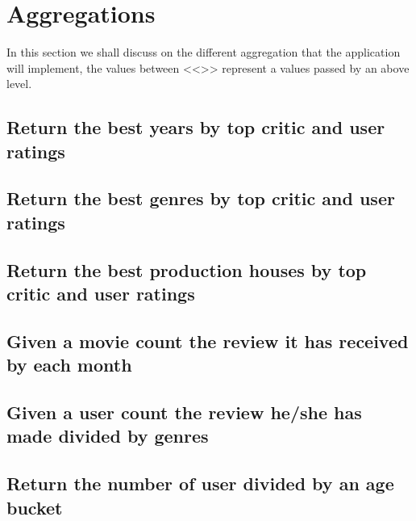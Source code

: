 \section{Aggregations}
In this section we shall discuss on the different aggregation that the application will implement, the values between <<>> represent a values passed by an above level.
\subsection{Return the best years by top critic and user ratings}\label{subsec:bestYear}


\subsection{Return the best genres by top critic and user ratings}\label{subsec:HOFGenres}


\subsection{Return the best production houses by top critic and user ratings}\label{subsec:productionHouses}


\subsection{Given a movie count the review it has received by each month}\label{subsec:reviewByYearMonth}


\subsection{Given a user count the review he/she has made divided by genres}\label{subsec:preferredGenres}


\subsection{Return the number of user divided by an age bucket}\label{subsec:userPopulationBucket}


